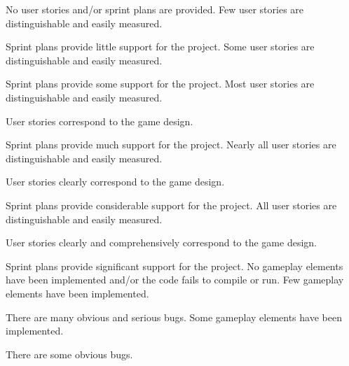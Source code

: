 \documentclass{../../fal_assignment}
\begin{document}
\begin{markingrubric}
%
        \grade\fail No user stories and/or sprint plans are provided.
        \grade Few user stories are distinguishable and easily measured.
            \par Sprint plans provide little support for the project.
        \grade Some user stories are distinguishable and easily measured.
            \par Sprint plans provide some support for the project.
        \grade Most user stories are distinguishable and easily measured.
            \par User stories correspond to the game design.
            \par Sprint plans provide much support for the project.
        \grade Nearly all user stories are distinguishable and easily measured.
            \par User stories clearly correspond to the game design.
            \par Sprint plans provide considerable support for the project.
        \grade All user stories are distinguishable and easily measured.
            \par User stories clearly and comprehensively correspond to the game design.
            \par Sprint plans provide significant support for the project.
%
        \grade\fail No gameplay elements have been implemented and/or the code fails to compile or run.
        \grade Few gameplay elements have been implemented.
            \par There are many obvious and serious bugs.
        \grade Some gameplay elements have been implemented.
            \par There are some obvious bugs.

\end{markingrubric}
\end{document}
